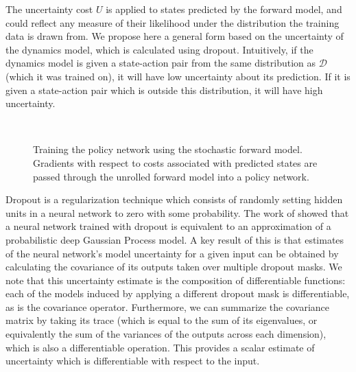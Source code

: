 \documentclass{article} %
\begin{document}
        The uncertainty cost $U$ is applied to states predicted by the forward model, and could reflect any measure of their likelihood under the distribution the training data is drawn from.
        We propose here a general form based on the uncertainty of the dynamics model, which is calculated using dropout.
        Intuitively, if the dynamics model is given a state-action pair from the same distribution as $\mathcal{D}$ (which it was trained on), it will have low uncertainty about its prediction.
        If it is given a state-action pair which is outside this distribution, it will have high uncertainty.

\begin{figure}[t!]
    \centering
     \\
    \label{svg}
    \caption{Training the policy network using the stochastic forward model. Gradients with respect to costs associated with predicted states are passed through the unrolled forward model into a policy network.}
\end{figure}
        
        
    Dropout \citep{Dropout2012, Dropout2014} is a regularization technique which consists of randomly setting hidden units in a neural network to zero with some probability.
    The work of \citep{Gal16} showed that a neural network trained with dropout is equivalent to an approximation of a probabilistic deep Gaussian Process model.
    A key result of this is that estimates of the neural network's model uncertainty for a given input can be obtained by calculating the covariance of its outputs taken over multiple dropout masks.
    We note that this uncertainty estimate is the composition of differentiable functions: each of the models induced by applying a different dropout mask is differentiable, as is the covariance operator.
    Furthermore, we can summarize the covariance matrix by taking its trace (which is equal to the sum of its eigenvalues, or equivalently the sum of the variances of the outputs across each dimension), which is also a differentiable operation. This provides a scalar estimate of uncertainty which is differentiable with respect to the input.
\end{document}
